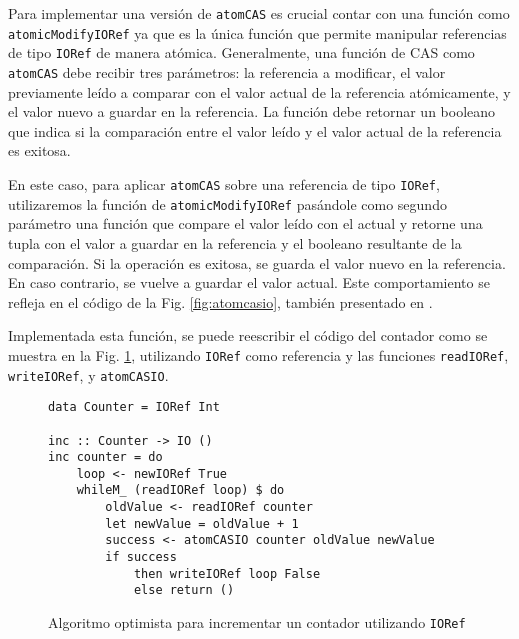 Para implementar una versión de \texttt{atomCAS} es crucial contar con una función como \texttt{atomicModifyIORef} ya que es la única función que permite manipular referencias de tipo \texttt{IORef} de manera atómica.
Generalmente, una función de CAS como \texttt{atomCAS} debe recibir tres parámetros: la referencia a modificar, el valor previamente leído a comparar con el valor actual de la referencia atómicamente, y el valor nuevo a guardar en la referencia.
La función debe retornar un booleano que indica si la comparación entre el valor leído y el valor actual de la referencia es exitosa.

En este caso, para aplicar \texttt{atomCAS} sobre una referencia de tipo \texttt{IORef}, utilizaremos la función de \texttt{atomicModifyIORef} pasándole como segundo parámetro una función que compare el valor leído con el actual y retorne una tupla con el valor a guardar en la referencia y el booleano resultante de la comparación.
Si la operación es exitosa, se guarda el valor nuevo en la referencia.
En caso contrario, se vuelve a guardar el valor actual.
Este comportamiento se refleja en el código de la Fig. \ref{fig:atomcasio}, también presentado en \cite{linked-list}.

Implementada esta función, se puede reescribir el código del contador como se muestra en la Fig. \ref{fig:lockfree-counter-example-ioref}, utilizando \texttt{IORef} como referencia y las funciones \texttt{readIORef}, \texttt{writeIORef}, y \texttt{atomCASIO}.

\begin{figure}[t]
\begin{verbatim}
data Counter = IORef Int

inc :: Counter -> IO ()
inc counter = do
    loop <- newIORef True
    whileM_ (readIORef loop) $ do
        oldValue <- readIORef counter
        let newValue = oldValue + 1
        success <- atomCASIO counter oldValue newValue
        if success
            then writeIORef loop False
            else return ()
\end{verbatim}
\caption{Algoritmo optimista para incrementar un contador utilizando \texttt{IORef}}
\label{fig:lockfree-counter-example-ioref}
\end{figure}

